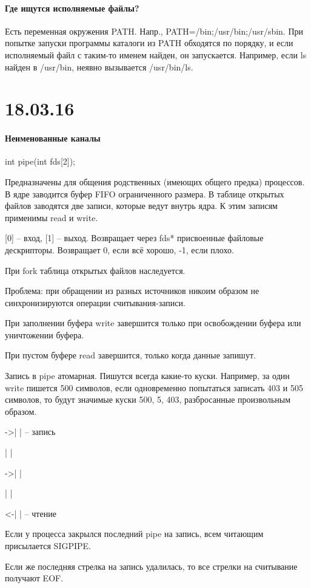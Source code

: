 \documentclass[a4paper,10pt]{article}
\begin{document}
\paragraph{Где ищутся исполняемые файлы?}
Есть переменная окружения PATH. Напр., PATH=/bin;/usr/bin;/usr/sbin. При попытке запуски программы каталоги из PATH обходятся по порядку, и если исполняемый файл с таким-то именем найден, он запускается. Например, если ls найден в /usr/bin, неявно вызывается /usr/bin/ls.

\section{18.03.16}
\paragraph{Неименованные каналы}
int pipe(int fds[2]);

Предназначены для общения родственных (имеющих общего предка) процессов.
В ядре заводится буфер FIFO ограниченного размера. В таблице открытых файлов заводятся две записи, которые ведут внутрь ядра. К этим записям применимы read и write.

[0] -- вход, [1] -- выход. Возвращает через fds* присвоенные файловые дескрипторы. Возвращает 0, если всё хорошо, -1, если плохо.

При fork таблица открытых файлов наследуется.

Проблема: при обращении из разных источников никоим образом не синхронизируются операции считывания-записи.

При заполнении буфера write завершится только при освобождении буфера или уничтожении буфера.

При пустом буфере read завершится, только когда данные запишут.

Запись в pipe атомарная. Пишутся всегда какие-то куски. Например, за один write пишется 500 символов, если одновременно попытаться записать 403 и 505 символов, то будут значимые куски 500, 5, 403, разбросанные произвольным образом.

->| | -- запись

  | |

->| |

  | |

<-| | -- чтение

Если у процесса закрылся последний pipe на запись, всем читающим присылается  SIGPIPE.

Если же последняя стрелка на запись удалилась, то все стрелки на считывание получают EOF.
\end{document}
